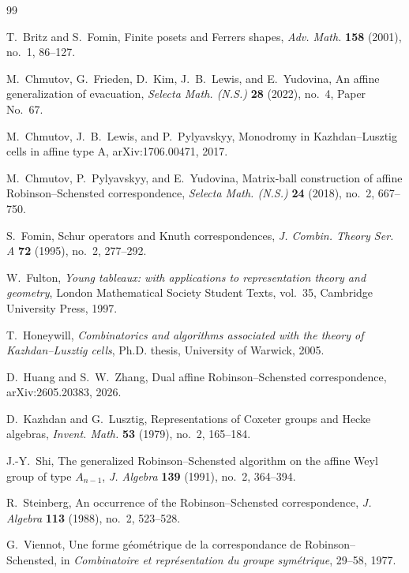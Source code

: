 \documentclass[11pt]{article}
\theoremstyle{definition}
\theoremstyle{remark}
\begin{document}
\begin{thebibliography}{99}
\raggedright
\footnotesize

T.~Britz and S.~Fomin,
\newblock Finite posets and Ferrers shapes,
\newblock \emph{Adv. Math.} \textbf{158} (2001), no.~1, 86--127.

M.~Chmutov, G.~Frieden, D.~Kim, J.~B.~Lewis, and E.~Yudovina,
\newblock An affine generalization of evacuation,
\newblock \emph{Selecta Math. (N.S.)} \textbf{28} (2022), no.~4, Paper No.~67.

M.~Chmutov, J.~B.~Lewis, and P.~Pylyavskyy,
\newblock Monodromy in Kazhdan--Lusztig cells in affine type A,
\newblock arXiv:1706.00471, 2017.

M.~Chmutov, P.~Pylyavskyy, and E.~Yudovina,
\newblock Matrix-ball construction of affine Robinson--Schensted correspondence,
\newblock \emph{Selecta Math. (N.S.)} \textbf{24} (2018), no.~2, 667--750.

S.~Fomin,
\newblock Schur operators and Knuth correspondences,
\newblock \emph{J. Combin. Theory Ser. A} \textbf{72} (1995), no.~2, 277--292.

W.~Fulton,
\newblock \emph{Young tableaux: with applications to representation theory and geometry},
\newblock London Mathematical Society Student Texts, vol.~35, Cambridge University
Press, 1997.

T.~Honeywill,
\newblock \emph{Combinatorics and algorithms associated with the theory of
Kazhdan--Lusztig cells},
\newblock Ph.D. thesis, University of Warwick, 2005.

D.~Huang and S.~W.~Zhang,
\newblock Dual affine Robinson--Schensted correspondence,
\newblock arXiv:2605.20383, 2026.

D.~Kazhdan and G.~Lusztig,
\newblock Representations of Coxeter groups and Hecke algebras,
\newblock \emph{Invent. Math.} \textbf{53} (1979), no.~2, 165--184.

J.-Y.~Shi,
\newblock The generalized Robinson--Schensted algorithm on the affine Weyl group of
type $A_{n-1}$,
\newblock \emph{J. Algebra} \textbf{139} (1991), no.~2, 364--394.

R.~Steinberg,
\newblock An occurrence of the Robinson--Schensted correspondence,
\newblock \emph{J. Algebra} \textbf{113} (1988), no.~2, 523--528.

G.~Viennot,
\newblock Une forme g\'eom\'etrique de la correspondance de Robinson--Schensted,
\newblock in \emph{Combinatoire et repr\'esentation du groupe sym\'etrique}, 29--58,
1977.

\end{thebibliography}
\end{document}
